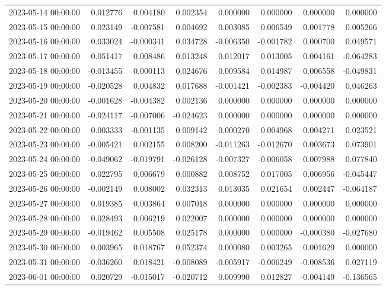 \begin{tabular}{lrrrrrrr}
2023-05-14 00:00:00 & 0.012776 & 0.004180 & 0.002354 & 0.000000 & 0.000000 & 0.000000 & 0.000000 \\
2023-05-15 00:00:00 & 0.023149 & -0.007581 & 0.004692 & 0.003085 & 0.006549 & 0.001778 & 0.005266 \\
2023-05-16 00:00:00 & 0.033024 & -0.000341 & 0.034728 & -0.006350 & -0.001782 & 0.000700 & 0.049571 \\
2023-05-17 00:00:00 & 0.051417 & 0.008486 & 0.013248 & 0.012017 & 0.013005 & 0.004161 & -0.064283 \\
2023-05-18 00:00:00 & -0.013455 & 0.000113 & 0.024676 & 0.009584 & 0.014987 & 0.006558 & -0.049831 \\
2023-05-19 00:00:00 & -0.020528 & 0.004832 & 0.017688 & -0.001421 & -0.002383 & -0.004420 & 0.046263 \\
2023-05-20 00:00:00 & -0.001628 & -0.004382 & 0.002136 & 0.000000 & 0.000000 & 0.000000 & 0.000000 \\
2023-05-21 00:00:00 & -0.024117 & -0.007006 & -0.024623 & 0.000000 & 0.000000 & 0.000000 & 0.000000 \\
2023-05-22 00:00:00 & 0.003333 & -0.001135 & 0.009142 & 0.000270 & 0.004968 & 0.004271 & 0.023521 \\
2023-05-23 00:00:00 & -0.005421 & 0.002155 & 0.008200 & -0.011263 & -0.012670 & 0.003673 & 0.073901 \\
2023-05-24 00:00:00 & -0.049062 & -0.019791 & -0.026128 & -0.007327 & -0.006058 & 0.007988 & 0.077840 \\
2023-05-25 00:00:00 & 0.022795 & 0.006679 & 0.000882 & 0.008752 & 0.017005 & 0.006956 & -0.045447 \\
2023-05-26 00:00:00 & -0.002149 & 0.008002 & 0.032313 & 0.013035 & 0.021654 & 0.002447 & -0.064187 \\
2023-05-27 00:00:00 & 0.019385 & 0.003864 & 0.007018 & 0.000000 & 0.000000 & 0.000000 & 0.000000 \\
2023-05-28 00:00:00 & 0.028493 & 0.006219 & 0.022007 & 0.000000 & 0.000000 & 0.000000 & 0.000000 \\
2023-05-29 00:00:00 & -0.019462 & 0.005508 & 0.025178 & 0.000000 & 0.000000 & -0.000380 & -0.027680 \\
2023-05-30 00:00:00 & 0.003965 & 0.018767 & 0.052374 & 0.000080 & 0.003265 & 0.001629 & 0.000000 \\
2023-05-31 00:00:00 & -0.036260 & 0.018421 & -0.008089 & -0.005917 & -0.006249 & -0.008536 & 0.027119 \\
2023-06-01 00:00:00 & 0.020729 & -0.015017 & -0.020712 & 0.009990 & 0.012827 & -0.004149 & -0.136565 \\

\end{tabular}
